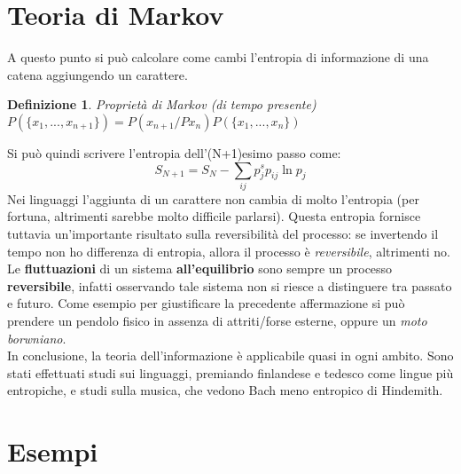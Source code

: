\documentclass[12pt, a4paper]{book}
\theoremstyle{theorem}
\newtheorem{definition}{Definizione}[section]
\begin{document}
		\section{Teoria di Markov}
			A questo punto si può calcolare come cambi l'entropia di informazione di una catena aggiungendo un carattere.
			\begin{definition}
				Proprietà di Markov (di tempo presente)\\
				$P(\{x_1,...,x_{n+1}\})=P(x_{n+1}/Px_n)P(\{x_1,...,x_{n}\})$
			\end{definition}
			Si può quindi scrivere l'entropia dell'(N+1)esimo passo come:
			\begin{equation}
				S_{N+1}=S_N-\sum_{ij}p_j^sp_{ij}\ln p_j
			\end{equation}
			Nei linguaggi l'aggiunta di un carattere non cambia di molto l'entropia (per fortuna, altrimenti sarebbe molto difficile parlarsi).
			Questa entropia fornisce tuttavia un'importante risultato sulla reversibilità del processo:
			se invertendo il tempo non ho differenza di entropia, allora il processo è \textit{reversibile}, altrimenti no.
			Le \textbf{fluttuazioni} di un sistema \textbf{all'equilibrio} sono sempre un processo \textbf{reversibile}, infatti osservando tale sistema non si riesce a distinguere tra passato e futuro.
			Come esempio per giustificare la precedente affermazione si può prendere un pendolo fisico in assenza di attriti/forse esterne, oppure un \textit{moto borwniano}.\\
			In conclusione, la teoria dell'informazione è applicabile quasi in ogni ambito.
			Sono stati effettuati studi sui linguaggi, premiando finlandese e tedesco come lingue più entropiche, e studi sulla musica, che vedono Bach meno entropico di Hindemith.
		
		\section{Esempi}
\end{document}
